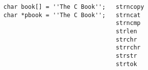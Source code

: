 \begin{frame}[fragile]{}
  \centerline{\large {}}

  \vspace{0.50cm}
  \begin{columns}
      \begin{lstlisting}[style = Cstyle]
char book[] = ''The C Book'';
char *pbook = ''The C Book'';
      \end{lstlisting}

      \vspace{0.60cm}
    \pause
      \begin{center}
	{\large
	\texttt{strncopy}\\[0.10cm]
	\texttt{strncat}\\[0.10cm]
	\texttt{strncmp}\\[0.40cm]

	\texttt{strlen}\\[0.40cm]

	\texttt{strchr}\\[0.10cm]
	\texttt{strrchr}\\[0.10cm]
	\texttt{strstr}\\[0.40cm]

	\texttt{strtok}
	}
     \end{center}
  \end{columns}
\end{frame}

\begin{frame}{}
  \centerline{\large {}}

  \vspace{0.50cm}
\end{frame}
